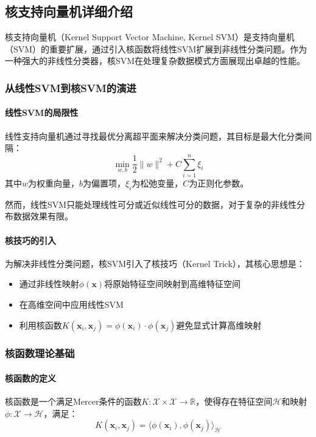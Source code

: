 \documentclass[UTF8]{report}
\theoremstyle{MyLineTheoremStyle} %
\theoremstyle{MyBlockTheoremStyle} %
\theoremstyle{MySubsubsectionStyle} %
\begin{document}
\subsection{核支持向量机详细介绍}

核支持向量机（Kernel Support Vector Machine, Kernel SVM）是支持向量机（SVM）的重要扩展，通过引入核函数将线性SVM扩展到非线性分类问题。作为一种强大的非线性分类器，核SVM在处理复杂数据模式方面展现出卓越的性能。

\subsubsection{从线性SVM到核SVM的演进}

\paragraph{线性SVM的局限性}
线性支持向量机通过寻找最优分离超平面来解决分类问题，其目标是最大化分类间隔：
\begin{equation}
\min_{w,b} \frac{1}{2}\|w\|^2 + C\sum_{i=1}^{n}\xi_i
\end{equation}
其中$w$为权重向量，$b$为偏置项，$\xi_i$为松弛变量，$C$为正则化参数。

然而，线性SVM只能处理线性可分或近似线性可分的数据，对于复杂的非线性分布数据效果有限。

\paragraph{核技巧的引入}
为解决非线性分类问题，核SVM引入了核技巧（Kernel Trick），其核心思想是：
\begin{itemize}
    \item 通过非线性映射$\phi(\mathbf{x})$将原始特征空间映射到高维特征空间
    \item 在高维空间中应用线性SVM
    \item 利用核函数$K(\mathbf{x}_i, \mathbf{x}_j) = \phi(\mathbf{x}_i) \cdot \phi(\mathbf{x}_j)$避免显式计算高维映射
\end{itemize}

\subsubsection{核函数理论基础}

\paragraph{核函数的定义}
核函数是一个满足Mercer条件的函数$K: \mathcal{X} \times \mathcal{X} \rightarrow \mathbb{R}$，使得存在特征空间$\mathcal{H}$和映射$\phi: \mathcal{X} \rightarrow \mathcal{H}$，满足：
\begin{equation}
K(\mathbf{x}_i, \mathbf{x}_j) = \langle\phi(\mathbf{x}_i), \phi(\mathbf{x}_j)\rangle_{\mathcal{H}}
\end{equation}
\end{document}
